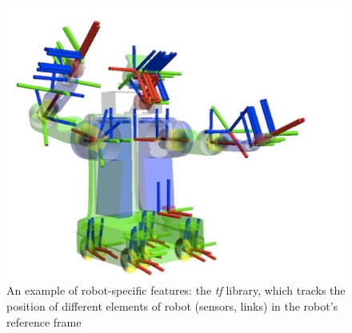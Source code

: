 \documentclass[a4paper, onecolumn]{report}
\begin{document}
\begin{figure}[htbp]
\centering
\includegraphics[width=.90\textwidth]{images/tf.jpeg}
\caption{An example of robot-specific features: the \emph{tf} library, which tracks the position of different elements of robot (sensors, links) in the robot's reference frame}
\end{figure}
\end{document}
